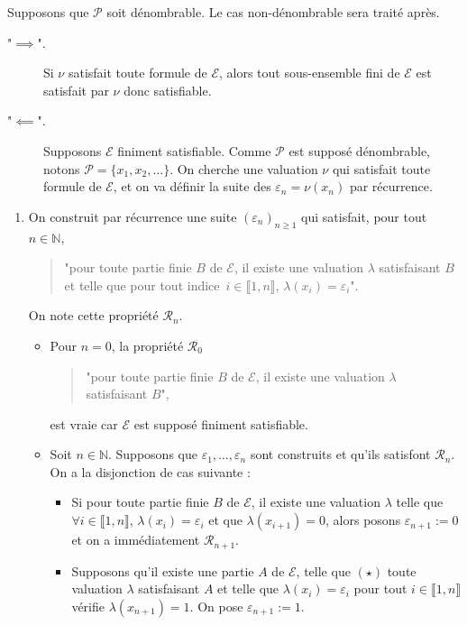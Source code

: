 \documentclass[./main]{subfiles}
\begin{document}
  \begin{prv}
    Supposons que $\mathcal{P}$ soit dénombrable. Le cas non-dénombrable sera traité après.

    \begin{description}
      \item["$\implies$".]
        Si $\nu$ satisfait toute formule de $\mathcal{E}$, alors tout sous-ensemble fini de $\mathcal{E}$ est satisfait par $\nu$ donc satisfiable.
      \item["$\impliedby$".]
        Supposons $\mathcal{E}$ finiment satisfiable. Comme $\mathcal{P}$ est supposé dénombrable, notons $\mathcal{P} = \{x_1, x_2, \ldots\}$.
        On cherche une valuation $\nu$ qui satisfait toute formule de $\mathcal{E}$, et on va définir la suite des $\varepsilon_n = \nu(x_n)$ par récurrence.
    \end{description}

    \begin{enumerate}
      \item On construit par récurrence une suite $(\varepsilon_n)_{n \ge 1}$ qui satisfait, pour tout $n \in \mathds{N}$,
        \begin{quote}
          "pour toute partie finie $B$ de $\mathcal{E}$, il existe une valuation $\lambda$ satisfaisant  $B$ et telle que pour tout indice~$i \in \llbracket 1, n\rrbracket$, $\lambda(x_i) = \varepsilon_i$".
        \end{quote}
        On note cette propriété $\mathcal{R}_n$.
        \begin{itemize}
          \item Pour $n = 0$, la propriété $\mathcal{R}_0$
            \begin{quote}
              "pour toute partie finie $B$ de $\mathcal{E}$, il existe une valuation $\lambda$ satisfaisant  $B$",
            \end{quote}
            est vraie car $\mathcal{E}$ est supposé finiment satisfiable.
          \item Soit $n \in \mathds{N}$. Supposons que $\varepsilon_1,\ldots,\varepsilon_n$ sont construits et qu'ils satisfont $\mathcal{R}_n$.
            On a la disjonction de cas suivante :
            \begin{itemize}
              \item Si pour toute partie finie $B$ de $\mathcal{E}$, il existe une valuation $\lambda$ telle que $\forall i \in \llbracket 1, n\rrbracket$, $\lambda(x_i) = \varepsilon_i$ et que  $\lambda(x_{i+1}) = 0$, alors posons $\varepsilon_{n+1} := 0$ et on a immédiatement $\mathcal{R}_{n+1}$.
              \item Supposons qu'il existe une partie $A$ de $\mathcal{E}$, telle que $(\star)$ toute valuation $\lambda$ satisfaisant $A$ et telle que $\lambda(x_i) = \varepsilon_i$ pour tout  $i \in \llbracket 1,n\rrbracket$ vérifie $\lambda(x_{n+1}) = 1$.
                On pose $\varepsilon_{n+1} := 1$.


\end{itemize}
\end{itemize}
\end{enumerate}
\end{prv}
\end{document}
